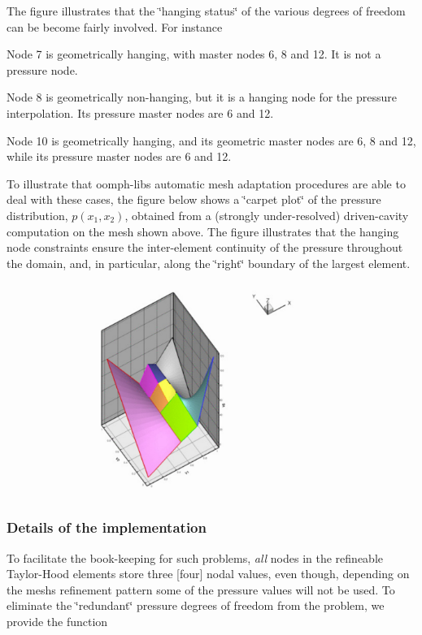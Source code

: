 The figure illustrates that the \char`\"{}hanging status\char`\"{} of the various degrees of freedom can be become fairly involved. For instance
\begin{DoxyItemize}
\item Node 7 is geometrically hanging, with master nodes 6, 8 and 12. It is not a pressure node.
\item Node 8 is geometrically non-\/hanging, but it is a hanging node for the pressure interpolation. Its pressure master nodes are 6 and 12.
\item Node 10 is geometrically hanging, and its geometric master nodes are 6, 8 and 12, while its pressure master nodes are 6 and 12.
\end{DoxyItemize}To illustrate that {\ttfamily oomph-\/lib\textquotesingle{}s} automatic mesh adaptation procedures are able to deal with these cases, the figure below shows a \char`\"{}carpet plot\char`\"{} of the pressure distribution, $ p(x_1,x_2) $, obtained from a (strongly under-\/resolved) driven-\/cavity computation on the mesh shown above. The figure illustrates that the hanging node constraints ensure the inter-\/element continuity of the pressure throughout the domain, and, in particular, along the \char`\"{}right\char`\"{} boundary of the largest element.

 
\begin{DoxyImage}
\includegraphics[width=0.75\textwidth]{hanging_pressure}
\end{DoxyImage}
\hypertarget{index_implementation}{}\subsubsection{Details of the implementation}\label{index_implementation}
To facilitate the book-\/keeping for such problems, {\itshape all} nodes in the refineable Taylor-\/\+Hood elements store three \mbox{[}four\mbox{]} nodal values, even though, depending on the mesh\textquotesingle{}s refinement pattern some of the pressure values will not be used. To eliminate the \char`\"{}redundant\char`\"{} pressure degrees of freedom from the problem, we provide the function


